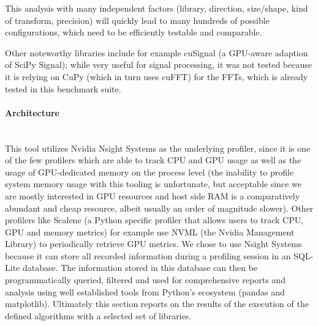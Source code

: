\documentclass[english,11pt,a4paper,table]{article} %
\begin{document}
This analysis with many independent factors (library, direction, size/shape, kind of transform, precision) will quickly lead to many hundreds of possible configurations, which need to be efficiently testable and comparable.

Other noteworthy libraries include for example cuSignal \cite{cusignal} (a GPU-aware adaption of SciPy Signal); while very useful for signal processing, it was not tested because it is relying on CuPy (which in turn uses cuFFT) for the FFTs, which is already tested in this benchmark suite.

\paragraph{Architecture}\mbox{}\\

This tool utilizes Nvidia Nsight Systems as the underlying profiler, since it is one of the few profilers which are able to track CPU and GPU usage as well as the usage of GPU-dedicated memory on the process level (the inability to profile system memory usage with this tooling is unfortunate, but acceptable since we are mostly interested in GPU resources and host side RAM is a comparatively abundant and cheap resource, albeit usually an order of magnitude slower).
Other profilers like Scalene \cite{Berger_Scalene_Scripting-Language_Aware_2020} (a Python specific profiler that allows users to track CPU, GPU and memory metrics) for example use NVML (the Nvidia Management Library) to periodically retrieve GPU metrics.
We chose to use Nsight Systems because it can store all recorded information during a profiling session in an SQL-Lite database.
The information stored in this database can then be programmatically queried, filtered and used for comprehensive reports and analysis using well established tools from Python's ecosystem (pandas and matplotlib). 
Ultimately this section reports on the results of the execution of the defined algorithms with a selected set of libraries.
\end{document}
